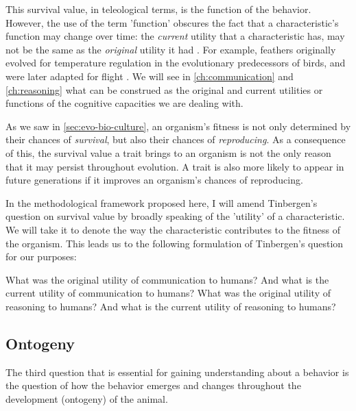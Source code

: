 This survival value, in teleological terms, is the function of the behavior.  However, the use of the term 'function' obscures the fact that a characteristic's function may change over time: the \emph{current} utility that a characteristic has, may not be the same as the \emph{original} utility it had \citep{BatesonLaland13}. For example, feathers originally evolved for temperature regulation in the evolutionary predecessors of birds, and were later adapted for flight \citep{Benton19, BatesonLaland13}.
We will see in \cref{ch:communication} and \cref{ch:reasoning} what can be construed as the original and current utilities or functions of the cognitive capacities we are dealing with.

As we saw in \cref{sec:evo-bio-culture}, an organism's fitness is not only determined by their chances of \emph{survival}, but also their chances of \emph{reproducing}. As a consequence of this, the survival value a trait brings to an organism is not the only reason that it may persist throughout evolution. A trait is also more likely to appear in future generations if it improves an organism's chances of reproducing.

In the methodological framework proposed here, I will amend Tinbergen's question on survival value by broadly speaking of the 'utility' of a characteristic. We will take it to denote the way the characteristic contributes to the fitness of the organism.
This leads us to the following formulation of Tinbergen's question for our purposes:

\begin{exe}
    \ex
    \begin{xlist}
        \ex
        What was the original utility of communication to humans? And what is the current utility of communication to humans?
        \ex
        What was the original utility of reasoning to humans? And what is the current utility of reasoning to humans?
    \end{xlist}
\end{exe}

\subsection{Ontogeny}
The third question that is essential for gaining understanding about a behavior is the question of how the behavior emerges and changes throughout the development (ontogeny) of the animal.

